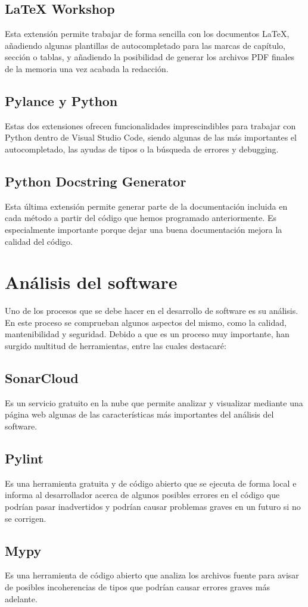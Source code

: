 \subsection{LaTeX Workshop}
Esta extensión permite trabajar de forma sencilla con los documentos LaTeX, añadiendo algunas plantillas de autocompletado para las marcas de capítulo, sección o tablas, y añadiendo la posibilidad de generar los archivos PDF finales de la memoria una vez acabada la redacción.
\subsection{Pylance y Python}
Estas dos extensiones ofrecen funcionalidades imprescindibles para trabajar con Python dentro de Visual Studio Code, siendo algunas de las más importantes el autocompletado, las ayudas de tipos o la búsqueda de errores y debugging.
\subsection{Python Docstring Generator}
Esta última extensión permite generar parte de la documentación incluida en cada método a partir del código que hemos programado anteriormente. Es especialmente importante porque dejar una buena documentación mejora la calidad del código.

\section{Análisis del software}
Uno de los procesos que se debe hacer en el desarrollo de software es su análisis. En este proceso se comprueban algunos aspectos del mismo, como la calidad, mantenibilidad y seguridad. Debido a que es un proceso muy importante, han surgido multitud de herramientas, entre las cuales destacaré:
\subsection{SonarCloud}
Es un servicio gratuito en la nube que permite analizar y visualizar mediante una página web algunas de las características más importantes del análisis del software.
\subsection{Pylint}
Es una herramienta gratuita y de código abierto que se ejecuta de forma local e informa al desarrollador acerca de algunos posibles errores en el código que podrían pasar inadvertidos y podrían causar problemas graves en un futuro si no se corrigen.
\subsection{Mypy}
Es una herramienta de código abierto que analiza los archivos fuente para avisar de posibles incoherencias de tipos que podrían causar errores graves más adelante.